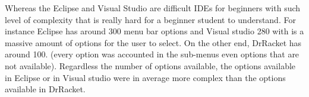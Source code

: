 Whereas the Eclipse and Visual Studio are difficult IDEs for beginners with such level of
complexity that is really hard for a beginner student to understand.
For instance Eclipse has around 300 menu bar options and Visual studio 280 with is a massive amount
of options for the user to select.
On the other end, DrRacket has around 100. (every option was accounted in the sub-menus %
even options that are not available).
Regardless the number of options available, the options available in Eclipse or
in Visual studio were in average more complex than the options available in DrRacket.


